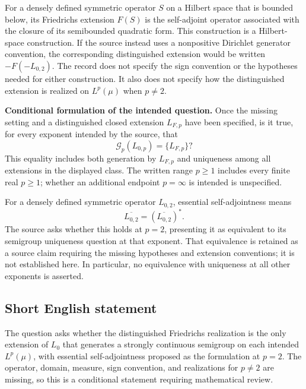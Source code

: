 \documentclass[11pt]{article}
\begin{document}
For a densely defined symmetric operator \(S\) on a Hilbert space that is bounded below, its Friedrichs extension \(F(S)\) is the self-adjoint operator associated with the closure of its semibounded quadratic form. This construction is a Hilbert-space construction. If the source instead uses a nonpositive Dirichlet generator convention, the corresponding distinguished extension would be written \(-F(-L_{0,2})\). The record does not specify the sign convention or the hypotheses needed for either construction. It also does not specify how the distinguished extension is realized on \(L^p(\mu)\) when \(p\ne2\).

\textbf{Conditional formulation of the intended question.} Once the missing setting and a distinguished closed extension \(L_{F,p}\) have been specified, is it true, for every exponent intended by the source, that
\[
\mathcal G_p(L_{0,p})=\{L_{F,p}\}?
\]
This equality includes both generation by \(L_{F,p}\) and uniqueness among all extensions in the displayed class. The written range \(p\geq1\) includes every finite real \(p\geq1\); whether an additional endpoint \(p=\infty\) is intended is unspecified.

For a densely defined symmetric operator \(L_{0,2}\), essential self-adjointness means
\[
\overline{L_{0,2}}=(\overline{L_{0,2}})^*.
\]
The source asks whether this holds at \(p=2\), presenting it as equivalent to its semigroup uniqueness question at that exponent. That equivalence is retained as a source claim requiring the missing hypotheses and extension conventions; it is not established here. In particular, no equivalence with uniqueness at all other exponents is asserted.
\subsection{Short English statement}
The question asks whether the distinguished Friedrichs realization is the only extension of \(L_0\) that generates a strongly continuous semigroup on each intended \(L^p(\mu)\), with essential self-adjointness proposed as the formulation at \(p=2\). The operator, domain, measure, sign convention, and realizations for \(p\ne2\) are missing, so this is a conditional statement requiring mathematical review.
\end{document}
